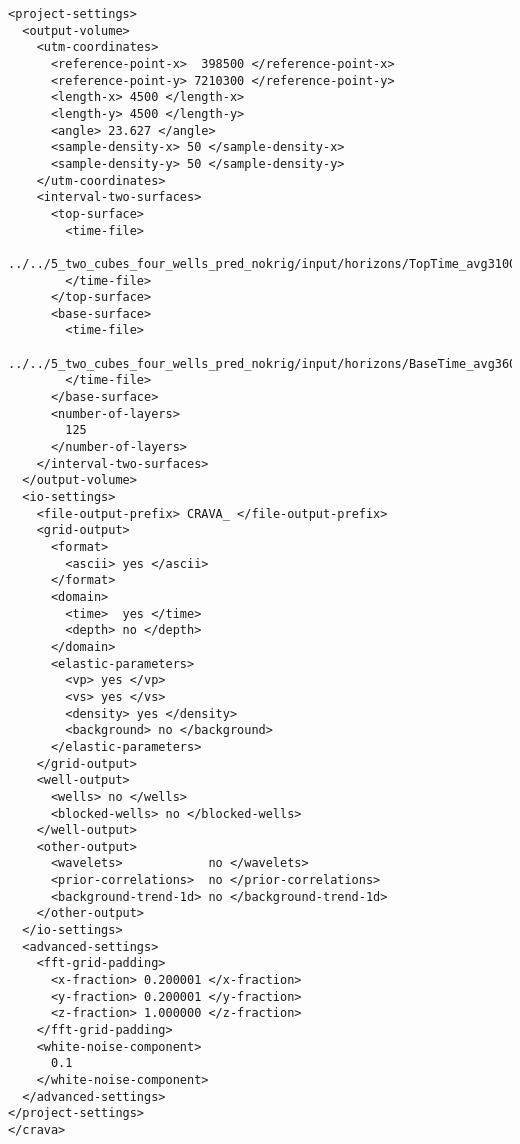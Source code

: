 \documentclass[screen,note,long,backref,indentpar]{nrdoc}
\begin{document}
\begin{small}
\begin{verbatim}
<project-settings>
  <output-volume>
    <utm-coordinates>
      <reference-point-x>  398500 </reference-point-x>
      <reference-point-y> 7210300 </reference-point-y>
      <length-x> 4500 </length-x>
      <length-y> 4500 </length-y>
      <angle> 23.627 </angle>
      <sample-density-x> 50 </sample-density-x>
      <sample-density-y> 50 </sample-density-y>
    </utm-coordinates>
    <interval-two-surfaces>
      <top-surface>
        <time-file>
          ../../5_two_cubes_four_wells_pred_nokrig/input/horizons/TopTime_avg3100ms.storm
        </time-file>
      </top-surface>
      <base-surface>
        <time-file>
          ../../5_two_cubes_four_wells_pred_nokrig/input/horizons/BaseTime_avg3600ms.storm
        </time-file>
      </base-surface>
      <number-of-layers>
        125
      </number-of-layers>
    </interval-two-surfaces>
  </output-volume>
  <io-settings>
    <file-output-prefix> CRAVA_ </file-output-prefix>
    <grid-output>
      <format>
        <ascii> yes </ascii>
      </format>
      <domain>
        <time>  yes </time>
        <depth> no </depth>
      </domain>
      <elastic-parameters>
        <vp> yes </vp>
        <vs> yes </vs>
        <density> yes </density>
        <background> no </background>
      </elastic-parameters>
    </grid-output>
    <well-output>
      <wells> no </wells>
      <blocked-wells> no </blocked-wells>
    </well-output>
    <other-output>
      <wavelets>            no </wavelets>
      <prior-correlations>  no </prior-correlations>
      <background-trend-1d> no </background-trend-1d>
    </other-output>
  </io-settings>
  <advanced-settings>
    <fft-grid-padding>
      <x-fraction> 0.200001 </x-fraction>
      <y-fraction> 0.200001 </y-fraction>
      <z-fraction> 1.000000 </z-fraction>
    </fft-grid-padding>
    <white-noise-component>
      0.1
    </white-noise-component>
  </advanced-settings>
</project-settings>
</crava>

\end{verbatim}
\end{small}



\end{document}

